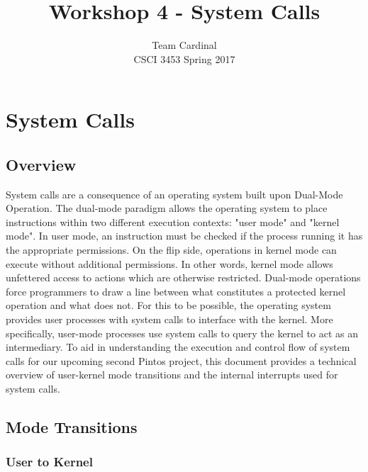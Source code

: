 \documentclass[11pt, letterpaper]{article}
\begin{document}

\title{Workshop 4 - System Calls}
\author{Team Cardinal\\CSCI 3453 Spring 2017}
\maketitle




\section{System Calls}

\subsection{Overview}
System calls are a consequence of an operating system built upon Dual-Mode Operation. The dual-mode paradigm allows the operating system to place instructions within two different execution contexts: "user mode" and "kernel mode". In user mode, an instruction must be checked if the process running it has the appropriate permissions. On the flip side, operations in kernel mode can execute without additional permissions. In other words, kernel mode allows unfettered access to actions which are otherwise restricted. Dual-mode operations force programmers to draw a line between what constitutes a protected kernel operation and what does not. For this to be possible, the operating system provides user processes with system calls to interface with the kernel. More specifically, user-mode processes use system calls to query the kernel to act as an intermediary. To aid in understanding the execution and control flow of system calls for our upcoming second Pintos project, this document provides a technical overview of user-kernel mode transitions and the internal interrupts used for system calls.

\subsection{Mode Transitions}

\subsubsection{User to Kernel}
\end{document}

